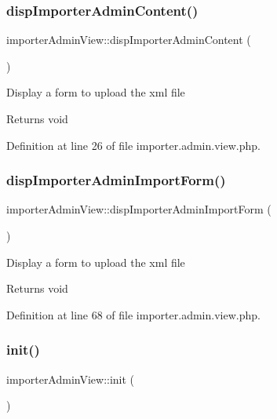 \subsubsection{\texorpdfstring{disp\+Importer\+Admin\+Content()}{dispImporterAdminContent()}}
{\footnotesize\ttfamily importer\+Admin\+View\+::disp\+Importer\+Admin\+Content (\begin{DoxyParamCaption}{ }\end{DoxyParamCaption})}

Display a form to upload the xml file \begin{DoxyReturn}{Returns}
void 
\end{DoxyReturn}


Definition at line 26 of file importer.\+admin.\+view.\+php.

\mbox{\label{classimporterAdminView_a5b4fa9f27407cc697b65505fafa4fc11}} 
\subsubsection{\texorpdfstring{disp\+Importer\+Admin\+Import\+Form()}{dispImporterAdminImportForm()}}
{\footnotesize\ttfamily importer\+Admin\+View\+::disp\+Importer\+Admin\+Import\+Form (\begin{DoxyParamCaption}{ }\end{DoxyParamCaption})}

Display a form to upload the xml file \begin{DoxyReturn}{Returns}
void 
\end{DoxyReturn}


Definition at line 68 of file importer.\+admin.\+view.\+php.

\mbox{\label{classimporterAdminView_a80f9a6e2e9051598556993dcbbe8027d}} 
\subsubsection{\texorpdfstring{init()}{init()}}
{\footnotesize\ttfamily importer\+Admin\+View\+::init (\begin{DoxyParamCaption}{ }\end{DoxyParamCaption})}

